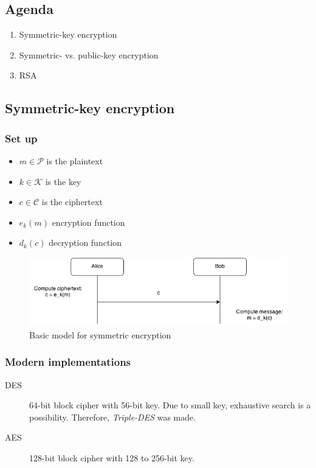 

\subsection{Agenda}
\begin{enumerate}
\item Symmetric-key encryption
\item Symmetric- vs. public-key encryption
\item RSA
\end{enumerate}
\subsection{Symmetric-key encryption}
\subsubsection{Set up}
\begin{itemize}
  \item $m \in \mathcal{P}$ is the plaintext
  \item $k \in \mathcal{K}$ is the key
  \item $c \in \mathcal{C}$ is the ciphertext
  \item $e_k(m)$ encryption function
  \item $d_k(c)$ decryption function
\end{itemize}

\begin{figure}[H]
  \begin{centering}
    \includegraphics[width=15cm]{images/1-sym-enc}
    \caption{Basic model for symmetric encryption}
  \end{centering}
  \label{fig:sym-enc}
\end{figure}

\subsubsection{Modern implementations}
\begin{description}
\item[DES] 64-bit block cipher with 56-bit key. Due to small key,
  exhaustive search is a possibility. Therefore, \emph{Triple-DES} was
  made.
\item[AES] 128-bit block cipher with 128 to 256-bit key.
\end{description}

